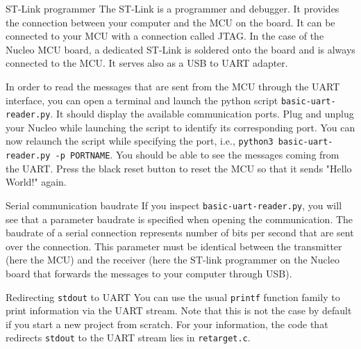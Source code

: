 \begin{bclogo}[couleur = gray!20, arrondi = 0.2, logo=\bcinfo]{ST-Link programmer}
The ST-Link is a programmer and debugger. It provides the connection between your computer and the MCU on the board. It can be connected to your MCU with a connection called JTAG. In the case of the Nucleo MCU board, a dedicated ST-Link is soldered onto the board and is always connected to the MCU. It serves also as a USB to UART adapter.
\end{bclogo}

In order to read the messages that are sent from the MCU through the UART interface, you can open a terminal and launch the python script \texttt{basic-uart-reader.py}. It should display the available communication ports. Plug and unplug your Nucleo while launching the script to identify its corresponding port. You can now relaunch the script while specifying the port, i.e., \texttt{python3 basic-uart-reader.py -p PORTNAME}. You should be able to see the messages coming from the UART. Press the black reset button to reset the MCU so that it sends "Hello World!" again. 

\begin{bclogo}[couleur = gray!20, arrondi = 0.2, logo=\bcinfo]{Serial communication baudrate }
If you inspect \texttt{basic-uart-reader.py}, you will see that a parameter baudrate is specified when opening the communication. The baudrate of a serial connection represents number of bits per second that are sent over the connection. This parameter must be identical between the transmitter (here the MCU) and the receiver (here the ST-link programmer on the Nucleo board that forwards the messages to your computer through USB). \end{bclogo}



\begin{bclogo}[couleur = gray!20, arrondi = 0.2, logo=\bcinfo]{Redirecting \texttt{stdout} to UART}
You can use the usual \texttt{printf} function family to print information via the UART stream. Note that this is not the case by default if you start a new project from scratch. For your information, the code that redirects \texttt{stdout} to the UART stream lies in \texttt{retarget.c}.
\end{bclogo}


